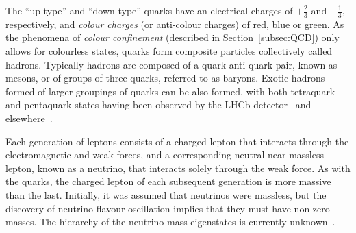 The ``up-type'' and ``down-type'' quarks have an electrical charges of $+\frac{2}{3}$ and $-\frac{1}{3}$,  respectively, and \emph{colour charges} (or anti-colour charges) of red, blue or green.
As the phenomena of \emph{colour confinement} (described in Section~\ref{subsec:QCD}) only allows for colourless states, quarks form composite particles collectively called hadrons.
Typically hadrons are composed of a quark anti-quark pair, known as mesons, or of groups of three quarks, referred to as baryons.
Exotic hadrons formed of larger groupings of quarks can be also formed, with both tetraquark and pentaquark states having been observed by the LHCb detector~\cite{Aaij:2014jqa,Aaij:2015tga} and elsewhere~\cite{Tanabashi:2018oca}.

Each generation of leptons consists of a charged lepton that interacts through the electromagnetic and weak forces, and a corresponding neutral near massless lepton, known as a neutrino, that interacts solely through the weak force.
As with the quarks, the charged lepton of each subsequent generation is more massive than the last.
Initially, it was assumed that neutrinos were massless, but the discovery of neutrino flavour oscillation implies that they must have non-zero masses. 
The hierarchy of the neutrino mass eigenstates is currently unknown~\cite{Nath:2018rqn}.

